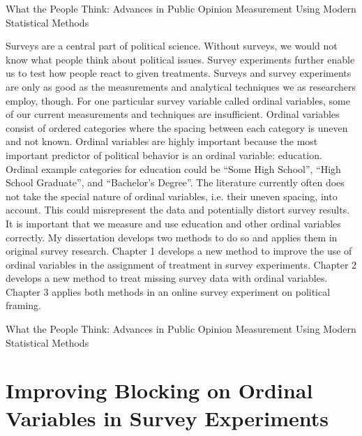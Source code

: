 \documentclass[11pt]{article}
\begin{document}
\begin{center}
\Large
\textcolor{NavyBlue}{What the People Think: Advances in Public Opinion Measurement Using Modern Statistical Methods}\\
\vspace{0.3cm}
\large
{}
\end{center}

\doublespacing

Surveys are a central part of political science. Without surveys, we would not know what people think about political issues. Survey experiments further enable us to test how people react to given treatments. Surveys and survey experiments are only as good as the measurements and analytical techniques we as researchers employ, though. For one particular survey variable called ordinal variables, some of our current measurements and techniques are insufficient. Ordinal variables consist of ordered categories where the spacing between each category is uneven and not known. Ordinal variables are highly important because the most important predictor of political behavior is an ordinal variable: education. Ordinal example categories for education could be ``Some High School'', ``High School Graduate'', and ``Bachelor's Degree''. The literature currently often does not take the special nature of ordinal variables, i.e. their uneven spacing, into account. This could misrepresent the data and potentially distort survey results. It is important that we measure and use education and other ordinal variables correctly. My dissertation develops two methods to do so and applies them in original survey research. Chapter 1 develops a new method to improve the use of ordinal variables in the assignment of treatment in survey experiments. Chapter 2 develops a new method to treat missing survey data with ordinal variables. Chapter 3 applies both methods in an online survey experiment on political framing. 




\clearpage

\begin{center}
\Large
\textcolor{NavyBlue}{What the People Think: Advances in Public Opinion Measurement Using Modern Statistical Methods}\\
\vspace{0.3cm}
\large
{}
\end{center}


\section{Improving Blocking on Ordinal Variables in Survey Experiments}
\end{document}
